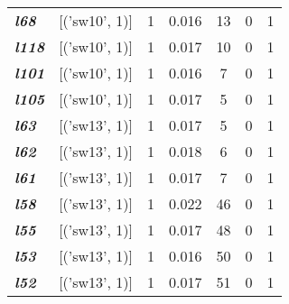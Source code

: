 \begin{table}
\begin{tabular}{llccccc}
    \textit{\textbf{l68}}                                           & {[}('sw10', 1){]}                         & 1             & 0.016              & 13             & 0              & 1           \\
    \textit{\textbf{l118}}                                          & {[}('sw10', 1){]}                         & 1             & 0.017              & 10             & 0              & 1           \\
    \textit{\textbf{l101}}                                          & {[}('sw10', 1){]}                         & 1             & 0.016              & 7              & 0              & 1           \\
    \textit{\textbf{l105}}                                          & {[}('sw10', 1){]}                         & 1             & 0.017              & 5              & 0              & 1           \\
    \textit{\textbf{l63}}                                           & {[}('sw13', 1){]}                         & 1             & 0.017              & 5              & 0              & 1           \\
    \textit{\textbf{l62}}                                           & {[}('sw13', 1){]}                         & 1             & 0.018              & 6              & 0              & 1           \\
    \textit{\textbf{l61}}                                           & {[}('sw13', 1){]}                         & 1             & 0.017              & 7              & 0              & 1           \\
    \textit{\textbf{l58}}                                           & {[}('sw13', 1){]}                         & 1             & 0.022              & 46             & 0              & 1           \\
    \textit{\textbf{l55}}                                           & {[}('sw13', 1){]}                         & 1             & 0.017              & 48             & 0              & 1           \\
    \textit{\textbf{l53}}                                           & {[}('sw13', 1){]}                         & 1             & 0.016              & 50             & 0              & 1           \\
    \textit{\textbf{l52}}                                           & {[}('sw13', 1){]}                         & 1             & 0.017              & 51             & 0              & 1           \\

\end{tabular}
\end{table}
